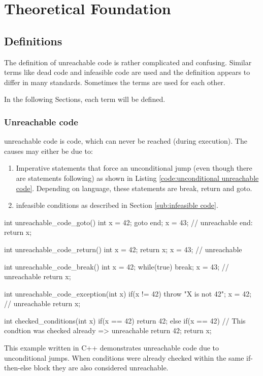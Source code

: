 
\chapter {Theoretical Foundation}
\label {cha:theoretical foundation}

\section{Definitions}
\label{sec:definitions}

The definition of unreachable code is rather complicated and confusing. 
Similar terms like dead code and infeasible code are used and the definition appears to differ in many standards. 
Sometimes the terms are used for each other.


In the following Sections, each term will be defined.

\subsection{Unreachable code}
\label{sub:unreachable code}
unreachable code is code, which can never be reached (during execution). 
The causes may either be due to:
\begin{enumerate}
	\item Imperative statements that force an unconditional jump (even though there are statements following) as shown in Listing \ref{code:unconditional unreachable code}. Depending on language, these statements are break, return and goto.
	\item infeasible conditions as described in Section \ref{sub:infeasible code}. 
\end{enumerate}


\begin{program}[h!]
	\begin{CppCode}
		int unreachable_code_goto() {
			int x = 42;
			goto end;
			x = 43; // unreachable
			end: return x;
		}
		
		int unreachable_code_return() {
			int x = 42;
			return x;
			x = 43; // unreachable
		}
		
		int unreachable_code_break() {
			int x = 42;
			while(true) {
				break;
				x = 43; // unreachable
			}
			return x;
		}
		
		int unreachable_code_exception(int x) {
			if(x != 42) {
				throw "X is not 42";
				x = 42; // unreachable
			}
			return x;
		}
		
		int checked_conditions(int x) {
			if(x == 42) {
				return 42;
			} else if(x == 42) { // This condtion was checked already => unreachable
				return 42;
			}
			return x;
	}\end{CppCode}
	\caption{This example written in C++ demonstrates unreachable code due to unconditional jumps. When conditions were already checked within the same if-then-else block they are also considered unreachable.}
	\label{code:unconditional unreachable code}
\end{program}


